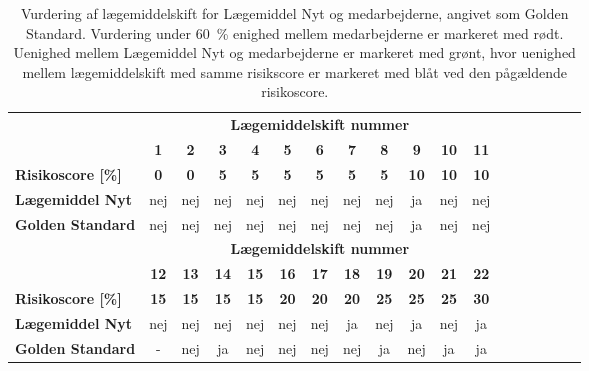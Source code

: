 \vspace{0.5cm}
\begin{longtable}{l|c|c|c|c|c|c|c|c|c|c|c|c|c|c|c|c|c}
\caption{Vurdering af lægemiddelskift for Lægemiddel Nyt og medarbejderne, angivet som Golden Standard. Vurdering under 60~\% enighed mellem medarbejderne er markeret med rødt. Uenighed mellem Lægemiddel Nyt og medarbejderne er markeret med grønt, hvor uenighed mellem lægemiddelskift med samme risikscore er markeret med blåt ved den pågældende risikoscore.}
	\label{table:test2} \\
\rowcolor[HTML]{C0C0C0} \textbf{} & \multicolumn{11}{|c}{\textbf{Lægemiddelskift nummer}} \\
\rowcolor[HTML]{C0C0C0} & \textbf{1} & \textbf{2} & \textbf{3} & \textbf{4} & \textbf{5} & \textbf{6} & \textbf{7} &  \textbf{8} & \textbf{9} & \textbf{10} & \textbf{11}   \\ \hline
\cellcolor[HTML]{C0C0C0}\textbf{Risikoscore [\%]} & \textbf{0}  & \textbf{0} &\textbf{5} & \textbf{5} & \textbf{5} & \textbf{5} & \textbf{5} & \textbf{5} & \cellcolor[HTML]{ECF4FF}\textbf{10} &  \textbf{10} & \textbf{10} \\ \hline
\cellcolor[HTML]{C0C0C0}\textbf{Lægemiddel Nyt} & nej & nej & nej & nej & nej & nej & nej & nej & ja & nej & nej \\ \hline
\cellcolor[HTML]{C0C0C0}\textbf{Golden Standard} & nej & nej & nej& nej & nej &nej & nej & nej& ja & nej & nej \\ \hline
\newpage
\rowcolor[HTML]{C0C0C0} & \multicolumn{11}{|c}{\textbf{Lægemiddelskift nummer}} \\
\rowcolor[HTML]{C0C0C0} & \textbf{12} & \textbf{13} & \textbf{14} &  \textbf{15} & \textbf{16} & \textbf{17} & \textbf{18} & \textbf{19} & \textbf{20} & \textbf{21} & \textbf{22}  \\ \hline
\cellcolor[HTML]{C0C0C0}\textbf{Risikoscore [\%]} & \cellcolor[HTML]{F6E6E5} \textbf{15} & \textbf{15} & \cellcolor[HTML]{ECF4FF}\textbf{15} & \textbf{15} & \textbf{20} & \textbf{20} & \cellcolor[HTML]{ECF4FF}\textbf{20} & \textbf{25} & \cellcolor[HTML]{ECF4FF}\textbf{25} & \textbf{25} & \cellcolor[HTML]{ECF4FF}\textbf{30} \\ \hline
\cellcolor[HTML]{C0C0C0}\textbf{Lægemiddel Nyt} & \cellcolor[HTML]{F6E6E5}nej & nej & \cellcolor[HTML]{D4EED3}nej & nej & nej & nej & \cellcolor[HTML]{D4EED3}ja & \cellcolor[HTML]{D4EED3}nej & \cellcolor[HTML]{D4EED3}ja & \cellcolor[HTML]{D4EED3} nej & ja\\ \hline
\cellcolor[HTML]{C0C0C0}\textbf{Golden Standard} & \cellcolor[HTML]{F6E6E5} - & nej & \cellcolor[HTML]{D4EED3}ja & nej & nej & nej & \cellcolor[HTML]{D4EED3}nej & \cellcolor[HTML]{D4EED3} ja & \cellcolor[HTML]{D4EED3}nej & \cellcolor[HTML]{D4EED3}ja & ja \\ \hline

\end{longtable}
